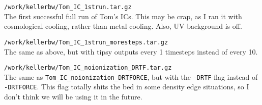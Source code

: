 \documentclass[11pt,letterpaper]{article}
\begin{document}
\begin{description}
\item{\verb!/work/kellerbw/Tom_IC_1strun.tar.gz!}\\ The first successful full run
of Tom's ICs.  This may be crap, as I ran it with cosmological cooling, rather
than metal cooling.  Also, UV background is off.
\item{\verb!/work/kellerbw/Tom_IC_1strun_moresteps.tar.gz!}\\ The same as above,
but with tipsy outputs every 1 timesteps instead of every 10.
\item{\verb!/work/kellerbw/Tom_IC_noionization_DRTF.tar.gz!}\\ The same as 
\verb!Tom_IC_noionization_DRTFORCE!, but with the \verb!-DRTF! flag instead of
\verb!-DRTFORCE!.  This flag totally shits the bed in some density edge 
situations, so I don't think we will be using it in the future.
\end{description}
\end{document}
